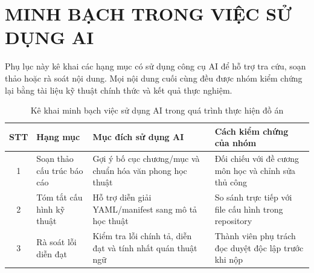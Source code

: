 \chapter{MINH BẠCH TRONG VIỆC SỬ DỤNG AI}
Phụ lục này kê khai các hạng mục có sử dụng công cụ AI để hỗ trợ tra cứu, soạn thảo hoặc rà soát nội dung.
Mọi nội dung cuối cùng đều được nhóm kiểm chứng lại bằng tài liệu kỹ thuật chính thức và kết quả thực nghiệm.

\begin{table}[htbp]
	\centering
	\caption{Kê khai minh bạch việc sử dụng AI trong quá trình thực hiện đồ án}
	\begin{tabularx}{\textwidth}{@{} c X X X @{}}
		\toprule
		\textbf{STT} & \textbf{Hạng mục} & \textbf{Mục đích sử dụng AI} & \textbf{Cách kiểm chứng của nhóm} \\
		\midrule
		1 & Soạn thảo cấu trúc báo cáo & Gợi ý bố cục chương/mục và chuẩn hóa văn phong học thuật & Đối chiếu với đề cương môn học và chỉnh sửa thủ công \\
		2 & Tóm tắt cấu hình kỹ thuật & Hỗ trợ diễn giải YAML/manifest sang mô tả học thuật & So sánh trực tiếp với file cấu hình trong repository \\
		3 & Rà soát lỗi diễn đạt & Kiểm tra lỗi chính tả, diễn đạt và tính nhất quán thuật ngữ & Thành viên phụ trách đọc duyệt độc lập trước khi nộp \\
		\bottomrule
	\end{tabularx}
\end{table}
